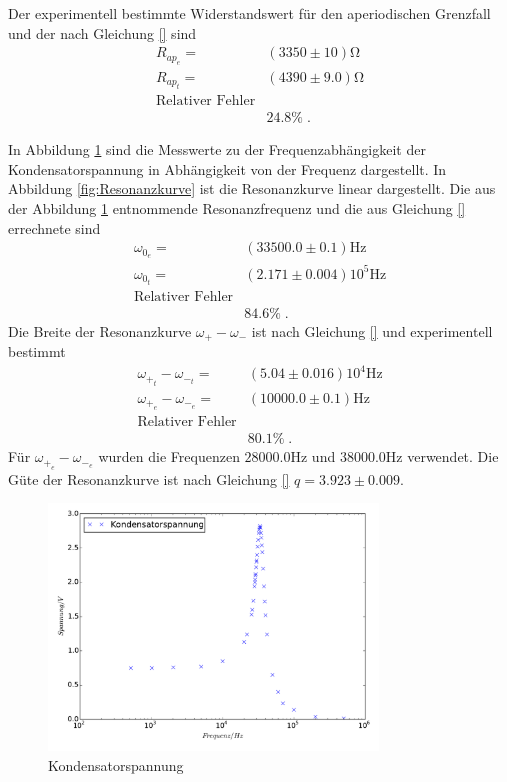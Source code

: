 Der experimentell bestimmte Widerstandswert für den aperiodischen Grenzfall
und  der nach Gleichung \eqref{} sind
\begin{align*}
  R_{ap_e}=&(3350\pm10)\si{\ohm}\\
  R_{ap_t}=&(4390\pm9.0)\si{\ohm}\\
  \text{Relativer Fehler}\\
   &24.8\%\;.
\end{align*}


In Abbildung \ref{fig:Kondensatorspannung} sind die
Messwerte zu der Frequenzabhängigkeit der Kondensatorspannung in Abhängigkeit
von der Frequenz dargestellt. In Abbildung \ref{fig:Resonanzkurve} ist die
Resonanzkurve linear dargestellt. Die aus der Abbildung \ref{fig:Kondensatorspannung}
entnommende Resonanzfrequenz und die aus Gleichung
\eqref{} errechnete sind
\begin{align*}
\omega_{0_e}=&(33500.0\pm0.1)\si{\hertz}\\
\omega_{0_t}=&(2.171\pm0.004)10^5\si{\hertz}\\
\text{Relativer Fehler}\\
 &84.6\%\;.
\end{align*}
 Die Breite der
Resonanzkurve $\omega_+-\omega_- $ ist nach Gleichung \eqref{}
 und experimentell bestimmt
\begin{align*}
 \omega_{+_t}-\omega_{-_t}=&(5.04\pm0.016)10^4\si{\hertz}\\
 \omega_{+_e}-\omega_{-_e}=&(10000.0\pm0.1)\si{\hertz}\\
 \text{Relativer Fehler}\\
  &80.1\%\;.
\end{align*}
Für $\omega_{+_e}-\omega_{-_e}$ wurden die Frequenzen $28000.0\si{\hertz}$ und
$38000.0\si{\hertz}$ verwendet.
Die Güte der Resonanzkurve ist nach Gleichung \eqref{} $q=3.923\pm0.009$.
\begin{figure}
  \centering
  \includegraphics[width=0.78\textwidth]{Kondensatorspannung.pdf}
  \caption{Kondensatorspannung}
  \label{fig:Kondensatorspannung}
\end{figure}
